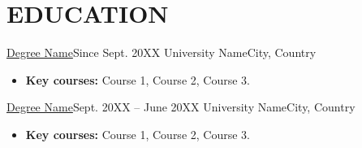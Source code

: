 \section{EDUCATION}
\resumeSubHeadingListStart

\resumeSubheading
  {\href{https://example.com}{Degree Name}}{Since Sept. 20XX}
  {University Name}{City, Country}
  \begin{itemize}[leftmargin=0.12in, label={}, itemsep=0pt]
    \item \small \textbf{Key courses:} Course 1, Course 2, Course 3.
  \end{itemize}

\vspace{-4pt}

\resumeSubheading
  {\href{https://example.com}{Degree Name}}{Sept. 20XX -- June 20XX}
  {University Name}{City, Country}
  \begin{itemize}[leftmargin=0.12in, label={}, itemsep=0pt]
    \item \small \textbf{Key courses:} Course 1, Course 2, Course 3.
  \end{itemize}

\resumeSubHeadingListEnd
